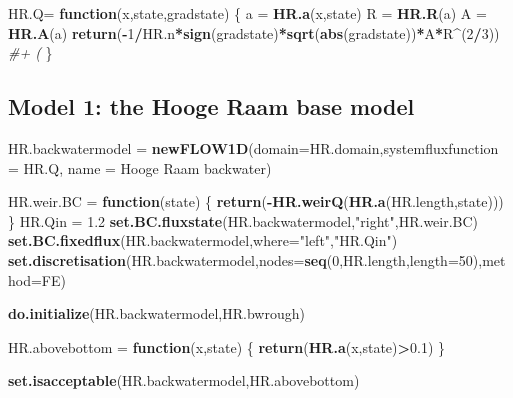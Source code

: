 \documentclass[
]{article}
\newenvironment{Shaded}{\begin{snugshade}}{\end{snugshade}}
\newcommand{\AttributeTok}[1]{\textcolor[rgb]{0.13,0.29,0.53}{#1}}
\newcommand{\CommentTok}[1]{\textcolor[rgb]{0.56,0.35,0.01}{\textit{#1}}}
\newcommand{\ControlFlowTok}[1]{\textcolor[rgb]{0.13,0.29,0.53}{\textbf{#1}}}
\newcommand{\DecValTok}[1]{\textcolor[rgb]{0.00,0.00,0.81}{#1}}
\newcommand{\FloatTok}[1]{\textcolor[rgb]{0.00,0.00,0.81}{#1}}
\newcommand{\FunctionTok}[1]{\textcolor[rgb]{0.13,0.29,0.53}{\textbf{#1}}}
\newcommand{\NormalTok}[1]{#1}
\newcommand{\OtherTok}[1]{\textcolor[rgb]{0.56,0.35,0.01}{#1}}
\newcommand{\SpecialCharTok}[1]{\textcolor[rgb]{0.81,0.36,0.00}{\textbf{#1}}}
\newcommand{\StringTok}[1]{\textcolor[rgb]{0.31,0.60,0.02}{#1}}
\begin{document}
\begin{Shaded}
\begin{Highlighting}[]
\NormalTok{HR.Q}\OtherTok{=} \ControlFlowTok{function}\NormalTok{(x,state,gradstate)}
\NormalTok{\{}
\NormalTok{  a }\OtherTok{=} \FunctionTok{HR.a}\NormalTok{(x,state)}
\NormalTok{  R }\OtherTok{=} \FunctionTok{HR.R}\NormalTok{(a)}
\NormalTok{  A }\OtherTok{=} \FunctionTok{HR.A}\NormalTok{(a)}
  \FunctionTok{return}\NormalTok{(}\SpecialCharTok{{-}}\DecValTok{1}\SpecialCharTok{/}\NormalTok{HR.n}\SpecialCharTok{*}\FunctionTok{sign}\NormalTok{(gradstate)}\SpecialCharTok{*}\FunctionTok{sqrt}\NormalTok{(}\FunctionTok{abs}\NormalTok{(gradstate))}\SpecialCharTok{*}\NormalTok{A}\SpecialCharTok{*}\NormalTok{R}\SpecialCharTok{\^{}}\NormalTok{(}\DecValTok{2}\SpecialCharTok{/}\DecValTok{3}\NormalTok{)) }\CommentTok{\#+ (}
\NormalTok{\}}
\end{Highlighting}
\end{Shaded}

\hypertarget{model-1-the-hooge-raam-base-model}{%
\subsection{Model 1: the Hooge Raam base
model}\label{model-1-the-hooge-raam-base-model}}

\begin{Shaded}
\begin{Highlighting}[]
\NormalTok{HR.backwatermodel }\OtherTok{=} \FunctionTok{newFLOW1D}\NormalTok{(}\AttributeTok{domain=}\NormalTok{HR.domain,}\AttributeTok{systemfluxfunction =}\NormalTok{ HR.Q,}
                              \AttributeTok{name =} \StringTok{\textquotesingle{}Hooge Raam backwater\textquotesingle{}}\NormalTok{)}

\NormalTok{HR.weir.BC }\OtherTok{=} \ControlFlowTok{function}\NormalTok{(state)}
\NormalTok{\{}
  \FunctionTok{return}\NormalTok{(}\SpecialCharTok{{-}}\FunctionTok{HR.weirQ}\NormalTok{(}\FunctionTok{HR.a}\NormalTok{(HR.length,state)))}
\NormalTok{\}}
\NormalTok{HR.Qin }\OtherTok{=} \FloatTok{1.2}
\FunctionTok{set.BC.fluxstate}\NormalTok{(HR.backwatermodel,}\StringTok{"right"}\NormalTok{,HR.weir.BC)}
\FunctionTok{set.BC.fixedflux}\NormalTok{(HR.backwatermodel,}\AttributeTok{where=}\StringTok{"left"}\NormalTok{,}\StringTok{"HR.Qin"}\NormalTok{)}
\FunctionTok{set.discretisation}\NormalTok{(HR.backwatermodel,}\AttributeTok{nodes=}\FunctionTok{seq}\NormalTok{(}\DecValTok{0}\NormalTok{,HR.length,}\AttributeTok{length=}\DecValTok{50}\NormalTok{),}\AttributeTok{method=}\StringTok{\textquotesingle{}FE\textquotesingle{}}\NormalTok{)}

\FunctionTok{do.initialize}\NormalTok{(HR.backwatermodel,HR.bwrough)}

\NormalTok{HR.abovebottom }\OtherTok{=} \ControlFlowTok{function}\NormalTok{(x,state)}
\NormalTok{\{}
  \FunctionTok{return}\NormalTok{(}\FunctionTok{HR.a}\NormalTok{(x,state)}\SpecialCharTok{\textgreater{}}\FloatTok{0.1}\NormalTok{)}
\NormalTok{\}}

\FunctionTok{set.isacceptable}\NormalTok{(HR.backwatermodel,HR.abovebottom)}
\end{Highlighting}
\end{Shaded}
\end{document}
